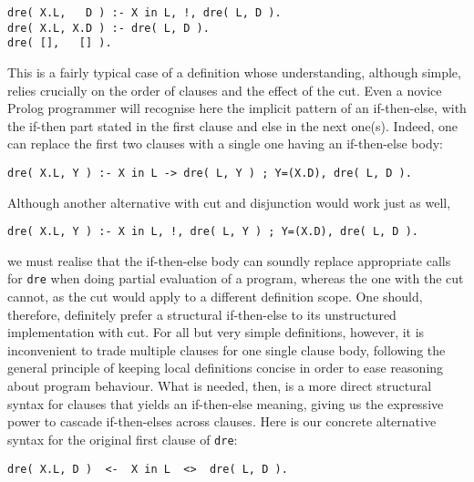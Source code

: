 \documentclass{tlp}
\def\mite{\textsf{if-then-else}}
\begin{document}
\vspace{-3.7pt}
\begin{verbatim}
dre( X.L,   D ) :- X in L, !, dre( L, D ).
dre( X.L, X.D ) :- dre( L, D ).
dre( [],   [] ).
\end{verbatim}
\vspace{-3.7pt}

\noindent
This is a fairly typical case of a definition whose understanding,
although simple, relies crucially on the order of clauses and the
effect of the cut. Even a novice
Prolog programmer will recognise here the implicit pattern of an
\textsf{if-then-else},  with the \textsf{if-then} part stated in the
first clause and \textsf{else} in the next one(s). Indeed, one
can replace the first two clauses with a single one having an
\textsf{if-then-else} body:

\vspace{-3.7pt}
\begin{verbatim}
dre( X.L, Y ) :- X in L -> dre( L, Y ) ; Y=(X.D), dre( L, D ).
\end{verbatim}
\vspace{-3.7pt}

\noindent Although another alternative with cut and
disjunction would work just as well,

\vspace{-3.7pt}
\begin{verbatim}
dre( X.L, Y ) :- X in L, !, dre( L, Y ) ; Y=(X.D), dre( L, D ).
\end{verbatim}
\vspace{-3.7pt}

\noindent we must realise that the \textsf{if-then-else} body can soundly replace
appropriate calls for \texttt{dre} when doing partial evaluation of a program,
whereas the one with the cut cannot, as the cut would apply to a different
definition scope. One should, therefore, definitely prefer a structural
\textsf{if-then-else} to its unstructured implementation with cut. For all but
very simple definitions, however, it is inconvenient to trade multiple clauses
for one single clause body, following the general principle of keeping local definitions
concise in order to ease reasoning about program behaviour. What is needed, then,
is a more direct structural syntax for clauses that yields an \mite{} meaning,
giving us the expressive power to cascade \mite{}s across clauses. Here is our
concrete alternative syntax for the original first clause of \texttt{dre}:

\vspace{-3.7pt}
\begin{verbatim}
dre( X.L, D )  <-  X in L  <>  dre( L, D ).
\end{verbatim}
\vspace{-3.7pt}
\end{document}
